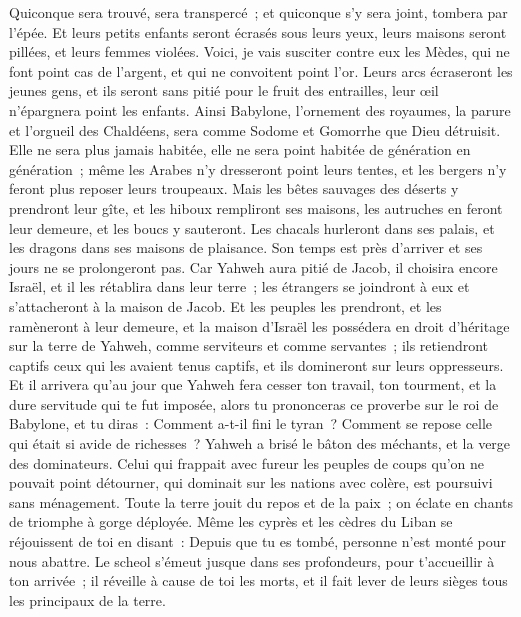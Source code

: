 \begin{multicols}{2}
Quiconque sera trouvé, sera transpercé~; et quiconque s'y sera joint, tombera par l'épée.
Et leurs petits enfants seront écrasés sous leurs yeux, leurs maisons seront pillées, et leurs femmes violées.
Voici, je vais susciter contre eux les Mèdes, qui ne font point cas de l'argent, et qui ne convoitent point l'or.
Leurs arcs écraseront les jeunes gens, et ils seront sans pitié pour le fruit des entrailles, leur œil n'épargnera point les enfants.
Ainsi Babylone, l'ornement des royaumes, la parure et l'orgueil des Chaldéens, sera comme Sodome et Gomorrhe que Dieu détruisit.
Elle ne sera plus jamais habitée, elle ne sera point habitée de génération en génération~; même les Arabes n'y dresseront point leurs tentes, et les bergers n'y feront plus reposer leurs troupeaux.
Mais les bêtes sauvages des déserts y prendront leur gîte, et les hiboux rempliront ses maisons, les autruches en feront leur demeure, et les boucs y sauteront.
Les chacals hurleront dans ses palais, et les dragons dans ses maisons de plaisance. Son temps est près d'arriver et ses jours ne se prolongeront pas.
\VerseOne{}Car Yahweh aura pitié de Jacob, il choisira encore Israël, et il les rétablira dans leur terre~; les étrangers se joindront à eux et s'attacheront à la maison de Jacob.
Et les peuples les prendront, et les ramèneront à leur demeure, et la maison d'Israël les possédera en droit d'héritage sur la terre de Yahweh, comme serviteurs et comme servantes~; ils retiendront captifs ceux qui les avaient tenus captifs, et ils domineront sur leurs oppresseurs.
Et il arrivera qu'au jour que Yahweh fera cesser ton travail, ton tourment, et la dure servitude qui te fut imposée,
alors tu prononceras ce proverbe sur le roi de Babylone, et tu diras~: Comment a-t-il fini le tyran~? Comment se repose celle qui était si avide de richesses~?
Yahweh a brisé le bâton des méchants, et la verge des dominateurs.
Celui qui frappait avec fureur les peuples de coups qu'on ne pouvait point détourner, qui dominait sur les nations avec colère, est poursuivi sans ménagement.
Toute la terre jouit du repos et de la paix~; on éclate en chants de triomphe à gorge déployée.
Même les cyprès et les cèdres du Liban se réjouissent de toi en disant~: Depuis que tu es tombé, personne n'est monté pour nous abattre.
Le scheol s'émeut jusque dans ses profondeurs, pour t'accueillir à ton arrivée~; il réveille à cause de toi les morts, et il fait lever de leurs sièges tous les principaux de la terre.

\end{multicols}
